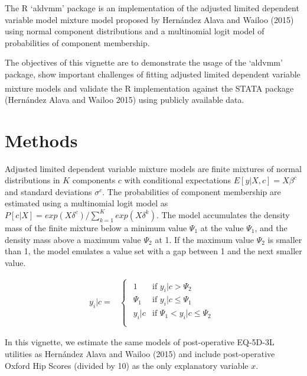\documentclass[
]{article}
\begin{document}
The R `aldvmm' package is an implementation of the adjusted limited dependent variable model mixture model proposed by Hernández Alava and Wailoo (2015) using normal component distributions and a multinomial logit model of probabilities of component membership.

The objectives of this vignette are to demonstrate the usage of the `aldvmm' package, show important challenges of fitting adjusted limited dependent variable mixture models and validate the R implementation against the STATA\textsuperscript{\textregistered} package (Hernández Alava and Wailoo 2015) using publicly available data.

\hypertarget{methods}{%
\section{Methods}\label{methods}}

Adjusted limited dependent variable mixture models are finite mixtures of normal distributions in \(K\) components \(c\) with conditional expectations \(E[y|X, c] = X\beta^{c}\) and standard deviations \(\sigma^{c}\). The probabilities of component membership are estimated using a multinomial logit model as \(P[c|X]=exp(X\delta^{c})/\sum_{k=1}^{K}exp(X\delta^{k})\). The model accumulates the density mass of the finite mixture below a minimum value \(\Psi_1\) at the value \(\Psi_1\), and the density mass above a maximum value \(\Psi_{2}\) at 1. If the maximum value \(\Psi_2\) is smaller than 1, the model emulates a value set with a gap between 1 and the next smaller value.

\begin{equation}
\label{eq:limits}
\begin{array}{ll}
y_{i}|c =& \begin{cases} \begin{array}{ll}
1        & \text{if } y_{i}|c > \Psi_{2}\\
\Psi_{1} & \text{if } y_{i}|c \leq \Psi_{1}\\
y_{i}|c  & \text{if } \Psi_{1} < y_{i}|c \leq \Psi_{2}\\
\end{array} \end{cases}
\end{array}
\end{equation}

In this vignette, we estimate the same models of post-operative EQ-5D-3L utilities as Hernández Alava and Wailoo (2015) and include post-operative Oxford Hip Scores (divided by 10) as the only explanatory variable \(x\).
\end{document}
